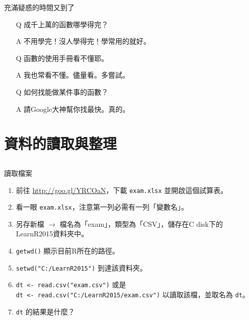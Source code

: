\documentclass[12pt]{beamer}
\begin{document}
\begin{frame}[fragile]{充滿疑惑的時間又到了}
\begin{itemize}
\item[Q] 成千上萬的函數哪學得完？
\item[A] 不用學完！沒人學得完！學常用的就好。
\item [ ] \pause
\item[Q] 函數的使用手冊看不懂耶。
\item[A] 我也常看不懂。儘量看。多嘗試。
\item [ ] \pause
\item[Q] 如何找能做某件事的函數？
\item[A] 請Google大神幫你找最快。真的。
\end{itemize}
\end{frame}


\section{資料的讀取與整理}\subsection{}

\begin{frame}[fragile]{讀取檔案}
\begin{enumerate}
\item 前往 \url{http://goo.gl/YRCOaN}，下載 \verb+exam.xlsx+ 並開啟這個試算表。
\item 看一眼 \verb+exam.xlsx+，注意第一列必需有一列「變數名」。
\item 另存新檔 $\rightarrow$ 檔名為「exam」，類型為「CSV」，儲存在C disk下的LearnR2015資料夾中。
\item \verb+getwd()+ 顯示目前R所在的路徑。
\item \verb+setwd("C:/LearnR2015")+ 到達該資料夾。
\item \verb+dt <- read.csv("exam.csv")+ 或是 \\
      \verb+dt <- read.csv("C:/LearnR2015/exam.csv")+ 以讀取該檔，並取名為 \verb+dt+。\\
\item \verb+dt+ 的結果是什麼？
\end{enumerate}
\end{frame}
\end{document}

